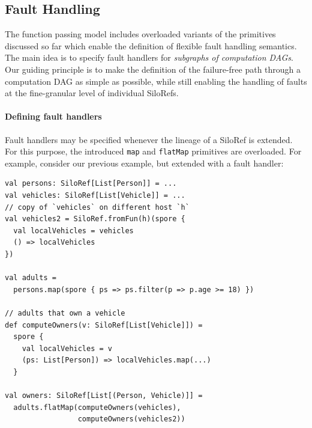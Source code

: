 \documentclass[preprint]{sigplanconf}
\theoremstyle{definition}
\theoremstyle{definition}
\begin{document}



\subsection{Fault Handling}
\label{sec:fault-handling}

The function passing model includes overloaded variants of the primitives discussed so far which
enable the definition of flexible fault handling semantics. The main idea is to
specify fault handlers for \emph{subgraphs of computation DAGs}. Our guiding
principle is to make the definition of the failure-free path through a
computation DAG as simple as possible, while still enabling the handling of
faults at the fine-granular level of individual SiloRefs.

\paragraph{Defining fault handlers}

Fault handlers may be specified whenever the lineage of a SiloRef is extended.
For this purpose, the introduced \verb|map| and \verb|flatMap| primitives are
overloaded. For example, consider our previous example, but extended with a
fault handler:

\begin{lstlisting}
val persons: SiloRef[List[Person]] = ...
val vehicles: SiloRef[List[Vehicle]] = ...
// copy of `vehicles` on different host `h`
val vehicles2 = SiloRef.fromFun(h)(spore {
  val localVehicles = vehicles
  () => localVehicles
})

val adults =
  persons.map(spore { ps => ps.filter(p => p.age >= 18) })

// adults that own a vehicle
def computeOwners(v: SiloRef[List[Vehicle]]) =
  spore {
    val localVehicles = v
    (ps: List[Person]) => localVehicles.map(...)
  }

val owners: SiloRef[List[(Person, Vehicle)]] =
  adults.flatMap(computeOwners(vehicles),
                 computeOwners(vehicles2))
\end{lstlisting}
\end{document}
